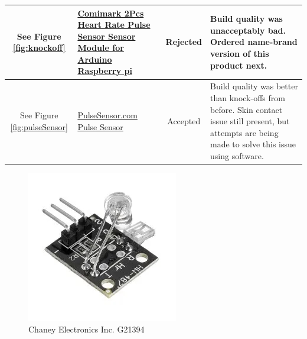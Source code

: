 \documentclass[12pt, titlepage]{article}
\begin{document}
\begin{table}[H]
\begin{tabular}{ | c | m{3cm} | c | m{7cm} |}
    \hline
    See Figure \ref{fig:knockoff}     & \href{https://www.amazon.ca/Comimark-Sensor-Module-Arduino-Raspberry/dp/B07V6VV8CM}{Comimark 2Pcs Heart Rate Pulse Sensor Sensor Module for Arduino Raspberry pi} & Rejected        & Build quality was unacceptably bad. Ordered name-brand version of this product next.                                                                                                                                                                                     \\                                                                                              
    \hline
    See Figure \ref{fig:pulseSensor} & \href{https://pulsesensor.com/}{PulseSensor.com Pulse Sensor}                                                                                                     & Accepted        & Build quality was better than knock-offs from before. Skin contact issue still present, but attempts are being made to solve this issue using software.                                                                                                                  \\
    \hline
  \end{tabular}
\end{table}

\begin{figure}[H]
\centering
  \includegraphics[scale=1]{G21394}
  \caption{Chaney Electronics Inc. G21394}
  \label{fig:G21394}
\end{figure}
\end{document}
